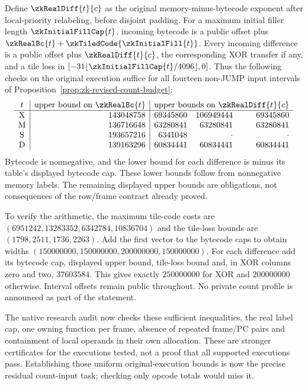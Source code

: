 Define $\zkRealDiff{t}{c}$ as the original memory-minus-bytecode exponent after local-priority relabeling, before disjoint padding. For a maximum initial filler length $\zkInitialFillCap{t}$, incoming bytecode is a public offset plus $\zkRealBc{t}+\zkTiledCode{\zkInitialFill{t}}$. Every incoming difference is a public offset plus $\zkRealDiff{t}{c}$, the corresponding XOR transfer if any, and a tile loss in $[-31\lfloor\zkInitialFillCap{t}/4096\rfloor,0]$. Thus the following checks on the original execution suffice for all fourteen non-JUMP input intervals of Proposition~\ref{prop:zk-revised-count-budget}:
\[
\begin{array}{c|r|rrr}
 t&\text{upper bound on }\zkRealBc{t}&\multicolumn{3}{c}{\text{upper bounds on }\zkRealDiff{t}{c}}\\\hline
 \mathrm X&143048758&69345860&106949444&69345860\\
 \mathrm M&136716648&63280841&63280841&63280841\\
 \mathrm S&193657216&6341048&\cdot&\cdot\\
 \mathrm D&139163296&60834441&60834441&60834441
\end{array}
\]
Bytecode is nonnegative, and the lower bound for each difference is minus its table's displayed bytecode cap. These lower bounds follow from nonnegative memory labels. The remaining displayed upper bounds are obligations, not consequences of the row/frame contract already proved.

To verify the arithmetic, the maximum tile-code costs are $(6951242,13283352,6342784,10836704)$ and the tile-loss bounds are $(1798,2511,1736,2263)$. Add the first vector to the bytecode caps to obtain widths $(150000000,150000000,200000000,150000000)$. For each difference add its bytecode cap, displayed upper bound, tile-loss bound and, in XOR columns zero and two, $37603584$. This gives exactly $250000000$ for XOR and $200000000$ otherwise. Interval offsets remain public throughout. No private count profile is announced as part of the statement.

The native research audit now checks these sufficient inequalities, the real label cap, one owning function per frame, absence of repeated frame/PC pairs and containment of local operands in their own allocation. These are stronger certificates for the executions tested, not a proof that all supported executions pass. Establishing those uniform original-execution bounds is now the precise residual count-input task; checking only opcode totals would miss it.

